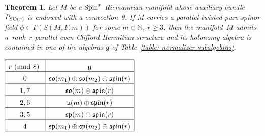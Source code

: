 \documentclass[10pt,a4paper]{amsart}
\numberwithin{equation}{section}
\newtheorem{Theorem}{Theorem}[section]
\begin{document}
\begin{Theorem}\label{theo: parallelness} Let $M$ be a ${\rm Spin}^r$ Riemannian manifold whose auxiliary bundle $P_{{\rm SO}(r)}$ is endowed with a connection~$\theta$. If $M$ carries a parallel twisted pure spinor field $\phi\in\Gamma(S(M,F,m))$ for some $m\in\mathbb{N}$, $r\geq 3$, then the manifold~$M$ admits a~rank~$r$ parallel even-Clifford Hermitian structure and its holonomy algebra is contained in one of the algebras $\mathfrak{g}$ of Table~{\rm \ref{table: normalizer subalgebras}}.
\begin{table}[h!]\centering
$
\begin{array}{|c|c|}
 \hline
 r \mbox{\ {\rm (mod 8)} } & \mathfrak{g}
 \rule{0pt}{3ex}
 \\
 \hline
 0 & \mathfrak{so}(m_1)\oplus\mathfrak{so}(m_2)\oplus {\mathfrak{spin}}(r)\rule{0pt}{3ex}\\
 \hline
 1,7 & \mathfrak{so}(m)\oplus {\mathfrak{spin}}(r)\rule{0pt}{3ex}\\
\hline
 2,6 & \mathfrak{u}(m)\oplus {\mathfrak{spin}}(r)\rule{0pt}{3ex}\\
\hline
 3,5 & \mathfrak{sp}(m)\oplus {\mathfrak{spin}}(r)\rule{0pt}{3ex}\\
\hline
 4 & \mathfrak{sp}(m_1)\oplus \mathfrak{sp}(m_2)\oplus {\mathfrak{spin}}(r)\rule{0pt}{3ex}\\
\hline
 \end{array}
$
\caption{}\label{table: normalizer subalgebras}
\end{table}
\end{Theorem}
\end{document}
